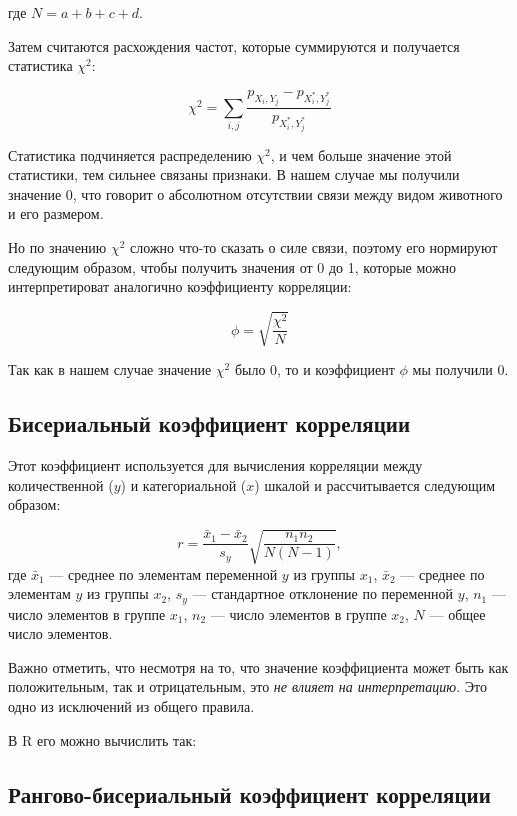 \documentclass[
  letterpaper,
  DIV=11,
  numbers=noendperiod]{scrreprt}
\theoremstyle{definition}
\theoremstyle{remark}
\begin{document}
где \(N = a + b + c + d\).

Затем считаются расхождения частот, которые суммируются и получается
статистика \(\chi^2\):

\[
\chi^2 = \sum_{i,j} \frac{p_{X_i,Y_j} - p_{X_i^*,Y_j^*}}{p_{X_i^*,Y_j^*}}
\]

Статистика подчиняется распределению \(\chi^2\), и чем больше значение
этой статистики, тем сильнее связаны признаки. В нашем случае мы
получили значение 0, что говорит о абсолютном отсутствии связи между
видом животного и его размером.

Но по значению \(\chi^2\) сложно что-то сказать о силе связи, поэтому
его нормируют следующим образом, чтобы получить значения от 0 до 1,
которые можно интерпретироват аналогично коэффициенту корреляции:

\[
\phi = \sqrt{\frac{\chi^2}{N}}
\]

Так как в нашем случае значение \(\chi^2\) было 0, то и коэффициент
\(\phi\) мы получили 0.

\subsection{Бисериальный коэффициент
корреляции}\label{ux431ux438ux441ux435ux440ux438ux430ux43bux44cux43dux44bux439-ux43aux43eux44dux444ux444ux438ux446ux438ux435ux43dux442-ux43aux43eux440ux440ux435ux43bux44fux446ux438ux438}

Этот коэффициент используется для вычисления корреляции между
количественной (\(y\)) и категориальной (\(x\)) шкалой и рассчитывается
следующим образом:

\[
r = \frac{\bar x_1 - \bar x_2}{s_y} \sqrt{\frac{n_1 n_2}{N(N-1)}},
\] где \(\bar x_1\) --- среднее по элементам переменной \(y\) из группы
\(x_1\), \(\bar x_2\) --- среднее по элементам \(y\) из группы \(x_2\),
\(s_y\) --- стандартное отклонение по переменной \(y\), \(n_1\) ---
число элементов в группе \(x_1\), \(n_2\) --- число элементов в группе
\(x_2\), \(N\) --- общее число элементов.

Важно отметить, что несмотря на то, что значение коэффициента может быть
как положительным, так и отрицательным, это \emph{не влияет на
интерпретацию}. Это одно из исключений из общего правила.

В R его можно вычислить так:

\subsection{Рангово-бисериальный коэффициент
корреляции}\label{ux440ux430ux43dux433ux43eux432ux43e-ux431ux438ux441ux435ux440ux438ux430ux43bux44cux43dux44bux439-ux43aux43eux44dux444ux444ux438ux446ux438ux435ux43dux442-ux43aux43eux440ux440ux435ux43bux44fux446ux438ux438}
\end{document}

